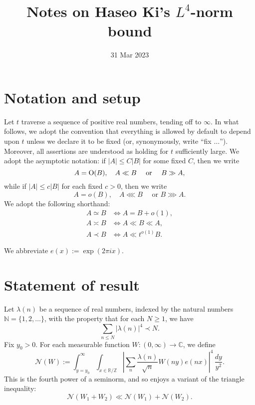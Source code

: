 \documentclass[reqno]{amsart} 
\begin{document}
\title{Notes on Haseo Ki's $L^4$-norm bound}
\date{31 Mar 2023}
\maketitle
\tableofcontents

\section{Notation and setup}\label{sec:cqx50ayzoa}
Let $t$ traverse a sequence of positive real numbers, tending off to $\infty$.  In what follows, we adopt the convention that everything is allowed by default to depend upon $t$ unless we declare it to be fixed (or, synonymously, write ``fix $\dotsc$'').  Moreover, all assertions are understood as holding for $t$ sufficiently large.  We adopt the asymptotic notation: if $|A| \leq C |B|$ for some fixed $C$, then we write
\begin{equation*}
  A = \operatorname{O}(B), \quad A \ll B \quad \text{ or } \quad  B \gg A,
\end{equation*}
while if $|A| \leq c |B|$ for each fixed $c > 0$, then we write
\begin{equation*}
  A = o(B), \quad  A \lll B \quad \text{ or }  B \ggg A.
\end{equation*}
We adopt the following shorthand:
\begin{align*}
  A \simeq B
  &\iff
    A = B + o(1),  \\
  A \asymp B &\iff A \ll B \ll A, \\
  A \prec B &\iff A \ll t^{o(1)} B.
\end{align*}

We abbreviate $e(x) := \exp(2 \pi i x)$.

\section{Statement of result}\label{sec:cqx50az0ci}
Let $\lambda(n)$ be a sequence of real numbers, indexed by the natural numbers $\mathbb{N} = \{1, 2, \dotsc \}$, with the property that for each $N \geq 1$, we have
\begin{equation}\label{eqn:fourth-moment-bound-lambda}
  \sum_{n \leq N} \left\lvert \lambda(n) \right\rvert^4 \prec N.
\end{equation}
Fix $y_0 > 0$.  For each measurable function $W : (0,\infty) \rightarrow \mathbb{C}$, we define
\begin{equation}\label{eqn:definition-N-of-W}
  \mathcal{N} (W) :=
  \int _{y = y _0 } ^\infty
  \int _{x \in \mathbb{R} / \mathbb{Z} }
  \left\lvert
    \sum _{n} \frac{\lambda(n)}{\sqrt{n}} W (n y) e (n x)
  \right\rvert ^4    \, \frac{d y}{ y ^2 }.
\end{equation}
This is the fourth power of a seminorm, and so enjoys a variant of the triangle inequality:
\begin{equation*}
  \mathcal{N} (W _1 + W _2) \ll \mathcal{N} (W _1 ) + \mathcal{N} (W _2 ).
\end{equation*}
\end{document}
